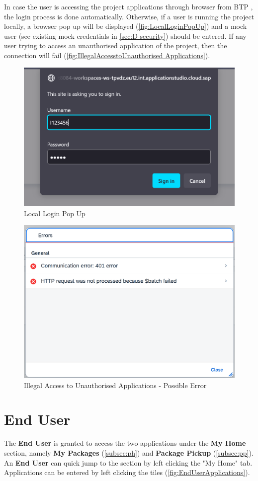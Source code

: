 In case the user is accessing the project applications through browser from BTP \cite{btp}, the login process is done automatically. Otherwise, if a user is running the project locally, a browser pop up will be displayed (\autoref{fig:LocalLoginPopUp}) and a mock user (see existing mock credentials in \autoref{sec:D-security}) should be entered.
If any user trying to access an unauthorised application of the project, then the connection will fail (\autoref{fig:IllegalAccesstoUnauthorised Applications}). 

\begin{figure}[H]
	\centering
	\includegraphics[width=0.5\linewidth]{images/user_doc/overviews/localLogin.png}
	\caption{Local Login Pop Up}
	\label{fig:LocalLoginPopUp}
\end{figure}

\begin{figure}[H]
	\centering
	\includegraphics[width=0.5\linewidth]{images/user_doc/overviews/ConnectionError1.png}
	\caption{Illegal Access to Unauthorised Applications - Possible Error}
	\label{fig:IllegalAccesstoUnauthorised Applications}
\end{figure}

\pagebreak

\section{End User}
\label{sec:UdocEndUser}

The \textbf{End User} is granted to access the two applications under the \textbf{My Home} section, namely \textbf{My Packages} (\autoref{subsec:ph}) and \textbf{Package Pickup} (\autoref{subsec:pp}). An \textbf{End User} can quick jump to the section by left clicking the "My Home" tab. Applications can be entered by left clicking the tiles (\autoref{fig:EndUserApplications}).

